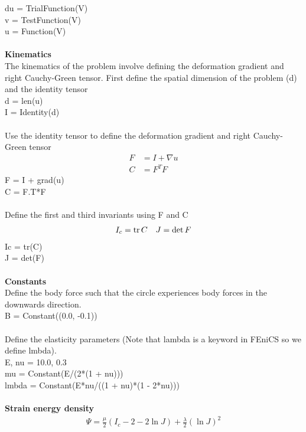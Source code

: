 \documentclass[12pt,3p]{article}
\begin{document}
{\selectfont
du = TrialFunction(V) \\     
v  = TestFunction(V) \\        
u  = Function(V) \\ \\
}
\textbf{Kinematics} \\
The kinematics of the problem involve defining the deformation gradient and right Cauchy-Green tensor. First define the spatial dimension of the problem (d) and the identity tensor \\
{\selectfont
d = len(u) \\             
I = Identity(d) \\ \\
} 
Use the identity tensor to define the deformation gradient and right Cauchy-Green tensor
\begin{align*}
F &= I + \nabla u \\
C &= F^T F
\end{align*}
{\selectfont 
F = I + grad(u) \\        
C = F.T*F \\ \\       
} 
Define the first and third invariants using F and C
\begin{align*}
I_c = \tr C \quad J = \det F
\end{align*}
{\selectfont
Ic = tr(C) \\
J  = det(F) \\ \\
}
\textbf{Constants} \\
Define the body force such that the circle experiences body forces in the downwards direction.  \\
{\selectfont
B  = Constant((0.0, -0.1)) \\ \\
} 
Define the elasticity parameters (Note that {\selectfont lambda} is a keyword in FEniCS so we define {\selectfont lmbda}). \\
{\selectfont
E, nu = 10.0, 0.3 \\
mu = Constant(E/(2*(1 + nu))) \\
lmbda = Constant(E*nu/((1 + nu)*(1 - 2*nu))) \\ \\
}
\textbf{Strain energy density} \\
\begin{align*}
\Psi = \frac{\mu}{2} (I_c - 2 - 2 \ln J ) + \frac{\lambda}{2} (\ln J)^2
\end{align*}
\end{document}
